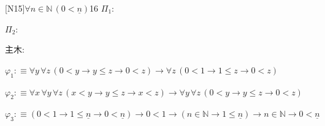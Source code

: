 \begin{fullproof}{[N15]}{$\forall n \in \mathbb{N}\,(0 < \underline{n})$}{16}\label{tree:IotaPos}
\noindent$\Pi_{1}$:
\begin{ptree}
\end{ptree}
\noindent$\Pi_{2}$:
\begin{ptree}
\end{ptree}
\noindent 主木:
\begin{ptree}
\noLine
{}
\noLine
{}
\end{ptree}
\begin{abbrevlist}
\item $\varphi_{1} :\equiv \forall y\,\forall z\,(0 < y \to y \leq z \to 0 < z) \to \forall z\,(0 < 1 \to 1 \leq z \to 0 < z)$
\item $\varphi_{2} :\equiv \forall x\,\forall y\,\forall z\,(x < y \to y \leq z \to x < z) \to \forall y\,\forall z\,(0 < y \to y \leq z \to 0 < z)$
\item $\varphi_{3} :\equiv (0 < 1 \to 1 \leq \underline{n} \to 0 < \underline{n}) \to 0 < 1 \to (n \in \mathbb{N} \to 1 \leq \underline{n}) \to n \in \mathbb{N} \to 0 < \underline{n}$
\end{abbrevlist}
\end{fullproof}

